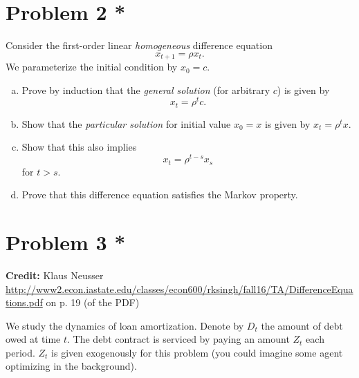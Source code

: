 \documentclass[11pt]{extarticle}
\theoremstyle{plain}
\theoremstyle{definition}
\begin{document}
\vspace{10mm}
\section*{Problem 2 *}

Consider the first-order linear \textit{homogeneous} difference equation 
\begin{equation*}
	x_{t+1} = \rho x_t.
\end{equation*}
We parameterize the initial condition by $x_0 = c$. 

\begin{enumerate}[(a)]
\item Prove by induction that the \textit{general solution} (for arbitrary $c$) is given by
\begin{equation*}
	x_t = \rho^t c.
\end{equation*}

\item Show that the \textit{particular solution} for initial value $x_0 = x$ is given by $x_t = \rho^t x$. 

\item Show that this also implies 
\begin{equation*}
	x_t = \rho^{t-s} x_s
\end{equation*}
for $t > s$.

\item Prove that this difference equation satisfies the Markov property.

\end{enumerate}



\vspace{10mm}
\section*{Problem 3 *}

\textbf{Credit:} Klaus Neusser \url{http://www2.econ.iastate.edu/classes/econ600/rksingh/fall16/TA/DifferenceEquations.pdf} on p. 19 (of the PDF)

\vspace{5mm}
\noindent
We study the dynamics of loan amortization. Denote by $D_t$ the amount of debt owed at time $t$. The debt contract is serviced by paying an amount $Z_t$ each period. $Z_t$ is given exogenously for this problem (you could imagine some agent optimizing in the background).
\end{document}
